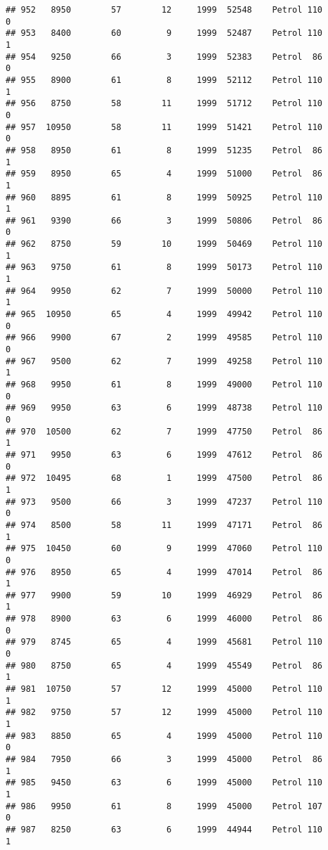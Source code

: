 \documentclass[]{article}
\begin{document}
\begin{verbatim}
## 952   8950        57        12     1999  52548    Petrol 110         0
## 953   8400        60         9     1999  52487    Petrol 110         1
## 954   9250        66         3     1999  52383    Petrol  86         0
## 955   8900        61         8     1999  52112    Petrol 110         1
## 956   8750        58        11     1999  51712    Petrol 110         0
## 957  10950        58        11     1999  51421    Petrol 110         0
## 958   8950        61         8     1999  51235    Petrol  86         1
## 959   8950        65         4     1999  51000    Petrol  86         1
## 960   8895        61         8     1999  50925    Petrol 110         1
## 961   9390        66         3     1999  50806    Petrol  86         0
## 962   8750        59        10     1999  50469    Petrol 110         1
## 963   9750        61         8     1999  50173    Petrol 110         1
## 964   9950        62         7     1999  50000    Petrol 110         1
## 965  10950        65         4     1999  49942    Petrol 110         0
## 966   9900        67         2     1999  49585    Petrol 110         0
## 967   9500        62         7     1999  49258    Petrol 110         1
## 968   9950        61         8     1999  49000    Petrol 110         0
## 969   9950        63         6     1999  48738    Petrol 110         0
## 970  10500        62         7     1999  47750    Petrol  86         1
## 971   9950        63         6     1999  47612    Petrol  86         0
## 972  10495        68         1     1999  47500    Petrol  86         1
## 973   9500        66         3     1999  47237    Petrol 110         0
## 974   8500        58        11     1999  47171    Petrol  86         1
## 975  10450        60         9     1999  47060    Petrol 110         0
## 976   8950        65         4     1999  47014    Petrol  86         1
## 977   9900        59        10     1999  46929    Petrol  86         1
## 978   8900        63         6     1999  46000    Petrol  86         0
## 979   8745        65         4     1999  45681    Petrol 110         0
## 980   8750        65         4     1999  45549    Petrol  86         1
## 981  10750        57        12     1999  45000    Petrol 110         1
## 982   9750        57        12     1999  45000    Petrol 110         1
## 983   8850        65         4     1999  45000    Petrol 110         0
## 984   7950        66         3     1999  45000    Petrol  86         1
## 985   9450        63         6     1999  45000    Petrol 110         1
## 986   9950        61         8     1999  45000    Petrol 107         0
## 987   8250        63         6     1999  44944    Petrol 110         1

\end{verbatim}
\end{document}
